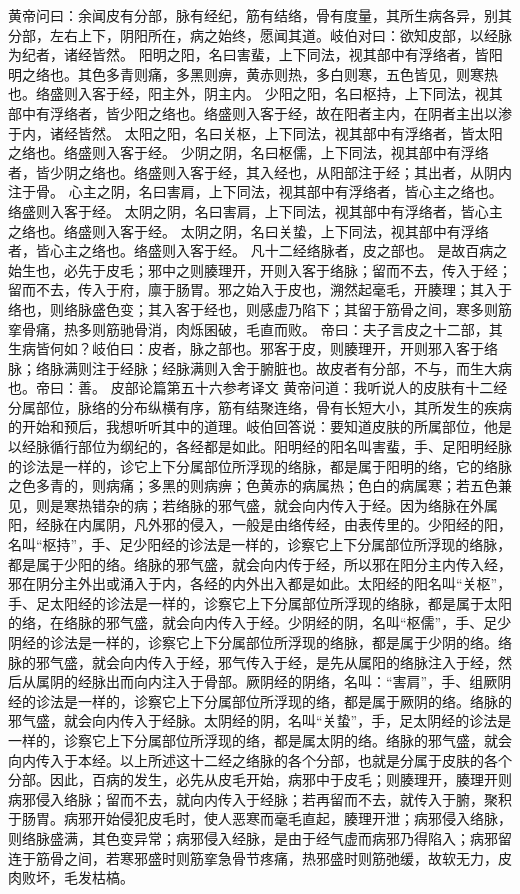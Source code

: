\documentclass[a4paper,12pt,UTF8,twoside]{ctexbook}
\begin{document}
黄帝问曰：余闻皮有分部，脉有经纪，筋有结络，骨有度量，其所生病各异，别其分部，左右上下，阴阳所在，病之始终，愿闻其道。岐伯对曰：欲知皮部，以经脉为纪者，诸经皆然。
阳明之阳，名曰害蜚，上下同法，视其部中有浮络者，皆阳明之络也。其色多青则痛，多黑则痹，黄赤则热，多白则寒，五色皆见，则寒热也。络盛则入客于经，阳主外，阴主内。
少阳之阳，名曰枢持，上下同法，视其部中有浮络者，皆少阳之络也。络盛则入客于经，故在阳者主内，在阴者主出以渗于内，诸经皆然。
太阳之阳，名曰关枢，上下同法，视其部中有浮络者，皆太阳之络也。络盛则入客于经。
少阴之阴，名曰枢儒，上下同法，视其部中有浮络者，皆少阴之络也。络盛则入客于经，其入经也，从阳部注于经；其出者，从阴内注于骨。
心主之阴，名曰害肩，上下同法，视其部中有浮络者，皆心主之络也。络盛则入客于经。
太阴之阴，名曰害肩，上下同法，视其部中有浮络者，皆心主之络也。络盛则入客于经。
太阴之阴，名曰关蛰，上下同法，视其部中有浮络者，皆心主之络也。络盛则入客于经。
凡十二经络脉者，皮之部也。
是故百病之始生也，必先于皮毛；邪中之则腠理开，开则入客于络脉；留而不去，传入于经；留而不去，传入于府，廪于肠胃。邪之始入于皮也，溯然起毫毛，开腠理；其入于络也，则络脉盛色变；其入客于经也，则感虚乃陷下；其留于筋骨之间，寒多则筋挛骨痛，热多则筋驰骨消，肉烁囷破，毛直而败。
帝曰：夫子言皮之十二部，其生病皆何如？岐伯曰：皮者，脉之部也。邪客于皮，则腠理开，开则邪入客于络脉；络脉满则注于经脉；经脉满则入舍于腑脏也。故皮者有分部，不与，而生大病也。帝曰：善。
皮部论篇第五十六参考译文
黄帝问道：我听说人的皮肤有十二经分属部位，脉络的分布纵横有序，筋有结聚连络，骨有长短大小，其所发生的疾病的开始和预后，我想听听其中的道理。岐伯回答说：要知道皮肤的所属部位，他是以经脉循行部位为纲纪的，各经都是如此。阳明经的阳名叫害蜚，手、足阳明经脉的诊法是一样的，诊它上下分属部位所浮现的络脉，都是属于阳明的络，它的络脉之色多青的，则病痛；多黑的则病痹；色黄赤的病属热；色白的病属寒；若五色兼见，则是寒热错杂的病；若络脉的邪气盛，就会向内传入于经。因为络脉在外属阳，经脉在内属阴，凡外邪的侵入，一般是由络传经，由表传里的。少阳经的阳，名叫“枢持”，手、足少阳经的诊法是一样的，诊察它上下分属部位所浮现的络脉，都是属于少阳的络。络脉的邪气盛，就会向内传于经，所以邪在阳分主内传入经，邪在阴分主外出或涌入于内，各经的内外出入都是如此。太阳经的阳名叫“关枢”，手、足太阳经的诊法是一样的，诊察它上下分属部位所浮现的络脉，都是属于太阳的络，在络脉的邪气盛，就会向内传入于经。少阴经的阴，名叫“枢儒”，手、足少阴经的诊法是一样的，诊察它上下分属部位所浮现的络脉，都是属于少阴的络。络脉的邪气盛，就会向内传入于经，邪气传入于经，是先从属阳的络脉注入于经，然后从属阴的经脉出而向内注入于骨部。厥阴经的阴络，名叫：“害肩”，手、组厥阴经的诊法是一样的，诊察它上下分属部位所浮现的络，都是属于厥阴的络。络脉的邪气盛，就会向内传入于经脉。太阴经的阴，名叫“关蛰”，手，足太阴经的诊法是一样的，诊察它上下分属部位所浮现的络，都是属太阴的络。络脉的邪气盛，就会向内传入于本经。以上所述这十二经之络脉的各个分部，也就是分属于皮肤的各个分部。因此，百病的发生，必先从皮毛开始，病邪中于皮毛；则腠理开，腠理开则病邪侵入络脉；留而不去，就向内传入于经脉；若再留而不去，就传入于腑，聚积于肠胃。病邪开始侵犯皮毛时，使人恶寒而毫毛直起，腠理开泄；病邪侵入络脉，则络脉盛满，其色变异常；病邪侵入经脉，是由于经气虚而病邪乃得陷入；病邪留连于筋骨之间，若寒邪盛时则筋挛急骨节疼痛，热邪盛时则筋弛缓，故软无力，皮肉败坏，毛发枯槁。
\end{document}
